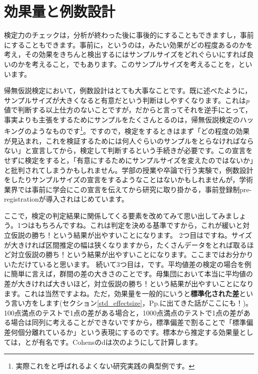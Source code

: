 \documentclass{ltjsbook}
\begin{document}
\section{効果量と例数設計}
検定力のチェックは，分析が終わった後に事後的にすることもできますし，事前にすることもできます。事前に，というのは，みたい効果がどの程度あるのかを考え，その効果をきちんと検出するにはサンプルサイズをどれぐらいにすれば良いのかを考えること，でもあります。このサンプルサイズを考えることを，といいます。

帰無仮説検定において，例数設計はとても大事なことです。既に述べたように，サンプルサイズが大きくなると有意だという判断はしやすくなります。これは$p$値で判断する以上仕方のないことですが，だからと言ってそれを逆手にとって，事実よりも主張をするためにサンプルをたくさんとるのは，帰無仮説検定のハッキングのようなものです\footnote{実際これをと呼ばれるよくない研究実践の典型例です。}。ですので，検定をするときはまず「どの程度の効果が見込まれ，これを検証するためには何人ぐらいのサンプルをとらなければならない」と宣言してから，検定して判断するという手続きが必要です。この宣言をせずに検定をすると，「有意にするためにサンプルサイズを変えたのではないか」と批判されてしまうかもしれません。学部の授業や卒論で行う実験で，例数設計をしたりサンプルサイズの宣言をするようなことはないかもしれませんが，学術業界では事前に学会にこの宣言を伝えてから研究に取り掛かる，事前登録制pre-registrationが導入されはじめています。

ここで，検定の判定結果に関係してくる要素を改めてみて思い出してみましょう。1つはもちろんですね。これは判定を決める基準ですから，これが緩いと対立仮説の勝ち！という結果が出やすいことになります。
2つ目はですね。サイズが大きければ区間推定の幅は狭くなりますから，たくさんデータをとれば取るほど対立仮説の勝ち！という結果が出やすいことになります。ここまではお分かりいただけていると思います。
続いて3つ目は，です。平均値差の検定の場合を例に簡単に言えば，群間の差の大きさのことです。母集団において本当に平均値の差が大きければ大きいほど，対立仮説の勝ち！という結果が出やすいことになります。これは当然ですよね。ただ，効果量を一般的にいうと\textbf{標準化された差}という言い方をします(セクション\ref{std_effectsize}，Pp.\pageref{std_effectsize}に出てきた話がここにも！)。100点満点のテストで1点の差がある場合と，1000点満点のテストで1点の差がある場合は同列に考えることができないですから，標準偏差で割ることで「標準偏差何個分離れているか」という表現にするのです。標本から推定する効果量としては，とが有名です。Cohensのdは次のようにして計算します。
\end{document}
